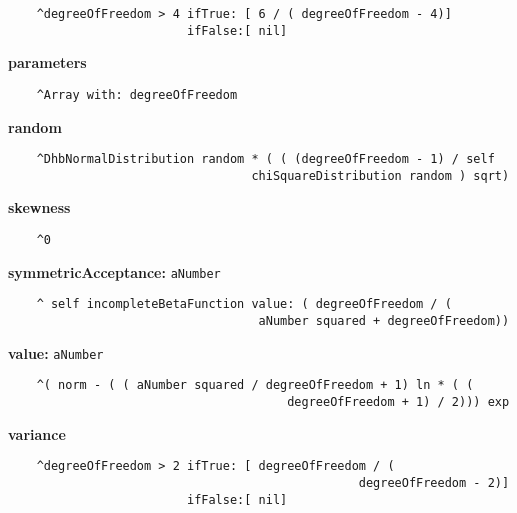 \begin{verbatim}
    ^degreeOfFreedom > 4 ifTrue: [ 6 / ( degreeOfFreedom - 4)]
                         ifFalse:[ nil]

\end{verbatim}
{\bf parameters}
\begin{verbatim}
    ^Array with: degreeOfFreedom

\end{verbatim}
{\bf random}
\begin{verbatim}
    ^DhbNormalDistribution random * ( ( (degreeOfFreedom - 1) / self 
                                  chiSquareDistribution random ) sqrt)

\end{verbatim}
{\bf skewness}
\begin{verbatim}
    ^0

\end{verbatim}
{\bf symmetricAcceptance:} {\tt aNumber}
\begin{verbatim}
    ^ self incompleteBetaFunction value: ( degreeOfFreedom / ( 
                                   aNumber squared + degreeOfFreedom))

\end{verbatim}
{\bf value:} {\tt aNumber}
\begin{verbatim}
    ^( norm - ( ( aNumber squared / degreeOfFreedom + 1) ln * ( ( 
                                       degreeOfFreedom + 1) / 2))) exp

\end{verbatim}
{\bf variance}
\begin{verbatim}
    ^degreeOfFreedom > 2 ifTrue: [ degreeOfFreedom / ( 
                                                 degreeOfFreedom - 2)]
                         ifFalse:[ nil]

\end{verbatim}

